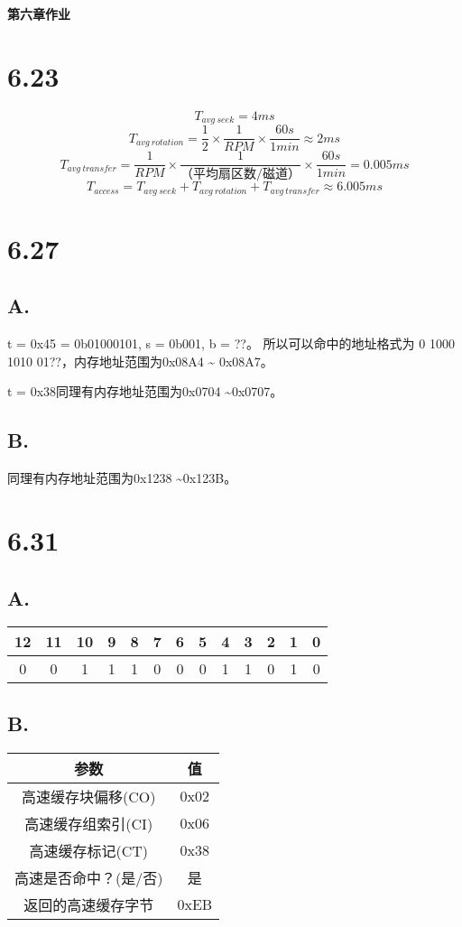\documentclass[11pt]{article}
\begin{document}
\begin{center}
  \textbf{\Huge{第六章作业}}
\end{center}

\section*{6.23}
\[T_{avg\ seek} = 4ms\]
\[T_{avg\ rotation} = \frac{1}{2} \times \frac{1}{RPM} \times \frac{60s}{1min}
  \approx 2ms \]
\[T_{avg\ transfer} = \frac{1}{RPM} \times \frac{1}{\text{（平均扇区数/磁道）}}
  \times \frac{60s}{1min} = 0.005ms\]
\[T_{access}=T_{avg\ seek}+T_{avg\ rotation}+T_{avg\ transfer} \approx 6.005ms\]

\section*{6.27}
\subsection*{A.}
t = 0x45 = 0b01000101, s = 0b001, b = ??。
所以可以命中的地址格式为 0 1000 1010 01??，内存地址范围为0x08A4 \textasciitilde
0x08A7。

t = 0x38同理有内存地址范围为0x0704 \textasciitilde 0x0707。
\subsection*{B.}
同理有内存地址范围为0x1238 \textasciitilde 0x123B。

\section*{6.31}
\subsection*{A.}
\begin{tabular}[htbp!]{|c|c|c|c|c|c|c|c|c|c|c|c|c|}
  \hline
  12 & 11 & 10 & 9 & 8 & 7 & 6 & 5 & 4 & 3 & 2 & 1 & 0 \\
  \hline
  0 &  0 &  1 & 1 & 1 & 0 & 0 & 0 & 1 & 1 & 0 & 1 & 0 \\
  \hline
\end{tabular}
\subsection*{B.}
\begin{tabular}[htbp!]{|c|c|}
  \hline
  参数 & 值 \\
  \hline
  高速缓存块偏移(CO) & 0x02 \\
  \hline
  高速缓存组索引(CI) & 0x06 \\
  \hline
  高速缓存标记(CT) & 0x38 \\
  \hline
  高速是否命中？(是/否) & 是 \\
  \hline
  返回的高速缓存字节 & 0xEB \\
  \hline
\end{tabular}
\end{document}
